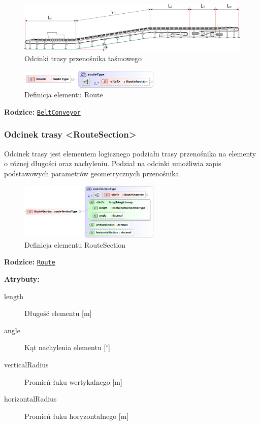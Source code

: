 \documentclass[12pt,a4paper]{article}
\begin{document}
\begin{figure}
  \centering
  \includegraphics[width=\textwidth]{png/belt_conveyor2_drw}
  \caption{Odcinki trasy przenośnika taśmowego}
  \label{fig:beltConveyor2-drw}
\end{figure}

\begin{figure}[H]
  \centering
  \includegraphics[width=0.6\textwidth]{png/liquid/Route}
  \caption{Definicja elementu Route}
  \label{fig:route-xsd}
\end{figure}

\noindent\textbf{Rodzice:} \texttt{\hyperref[sec:BeltConveyor]{BeltConveyor}}


\subsubsection{Odcinek trasy <RouteSection>}
Odcinek trasy jest elementem logicznego podziału trasy przenośnika na elementy o
różnej długości oraz nachyleniu. Podział na odcinki umożliwia zapis podstawowych
parametrów geometrycznych przenośnika.

\begin{figure}[H]
  \centering
  \includegraphics[width=0.6\textwidth]{png/liquid/RouteSection}
  \caption{Definicja elementu RouteSection}
  \label{fig:routeSection-xsd}
\end{figure}

\noindent\textbf{Rodzice:} \texttt{\hyperref[sec:Route]{Route}}

\noindent\textbf{Atrybuty:}
\begin{description}
\item[length] Długość elementu [m]
\item[angle] Kąt nachylenia elementu [$^\circ$]
\item[verticalRadius] Promień łuku wertykalnego [m]
\item[horizontalRadius] Promień łuku horyzontalnego [m]
\end{description}
\end{document}
